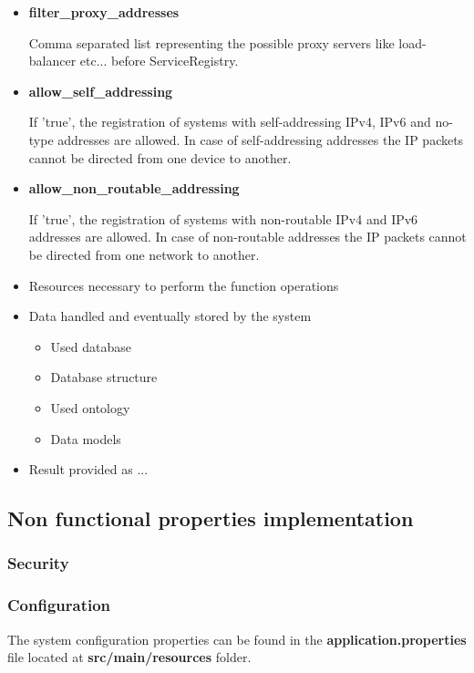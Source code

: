 \documentclass[a4paper]{arrowhead}
\begin{document}
\begin{itemize}
    \item \textbf{filter\_proxy\_addresses}
  
    Comma separated list representing the possible proxy servers like load-balancer etc... before ServiceRegistry.
    
    \item \textbf{allow\_self\_addressing}
  
    If 'true', the registration of systems with self-addressing IPv4, IPv6 and no-type addresses are allowed. In case of self-addressing addresses the IP packets cannot be directed from one device to another.
    
    \item \textbf{allow\_non\_routable\_addressing}
  
    If 'true', the registration of systems with non-routable IPv4 and IPv6 addresses are allowed. In case of non-routable addresses the IP packets cannot be directed from one network to another.
\end{itemize}

\color{red}
  \begin{itemize}
  \item Resources necessary to perform the function operations
  \item Data handled and eventually stored by the system
    \begin{itemize}
    \item Used database
    \item Database structure
    \item Used ontology
    \item Data models
    \end{itemize}
  \item Result provided as ...
  \end{itemize}
\color{black}

\subsection {Non functional properties implementation}
\subsubsection {Security}
\subsubsection {Configuration}
   
The system configuration properties can be found in the \textbf{application.properties} file located at \textbf{src/main/resources} folder.
\end{document}
